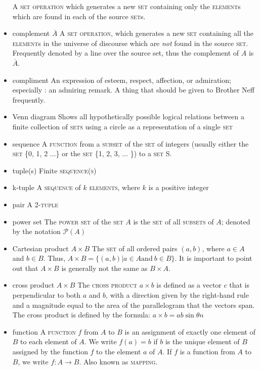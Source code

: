 \documentclass{article}
\newcommand{\term}[1]{\textsc{#1}}
\begin{document}
\begin{itemize}
  \subitem A \term{set operation} which generates a new \term{set} containing only the \term{element}s which are found in each of the source \term{set}s.
\item complement $\overline{A}$
  \subitem A \term{set operation}, which generates a new \term{set} containing all the \term{element}s in the universe of discourse which are \emph{not} found in the source \term{set}.  Frequently denoted by a line over the source set, thus the complement of $A$ is $\overline{A}$.
\item compliment
  \subitem An expression of esteem, respect, affection, or admiration; especially : an admiring remark. A thing that should be given to Brother Neff frequently. 
\item Venn diagram
  \subitem Shows all hypothetically possible logical relations between a finite collection of \term{sets} using a circle as a representation of a single \term{set}
\item sequence
  \subitem A \term{function} from a \term{subset} of the \term{set} of integers (usually either the \term{set} \{0, 1, 2 ...\} or the \term{set} \{1, 2, 3, ... \}) to a \term{set} S. 
\item tuple(s)
   \subitem Finite \term{sequence(s)}
\item k-tuple
   \subitem A \term{sequence} of $k$ \term{elements}, where $k$ is a positive integer
\item pair
   \subitem A 2-\term{tuple}
\item power set 
  \subitem The \term{power set} of the \term{set} $A$ is the \term{set} of all \term{subsets} of $A$; denoted by the notation $\mathcal{P}\left(A\right)$

\item Cartesian product $A \times B$
  \subitem The \term{set} of all ordered pairs $(a, b)$, where $a \in A$ and $b \in B$. Thus, $A \times B = \{(a,b) | a\in A \text{and} \ b\in B\}$. It is important to point out that $A \times B$ is generally not the same as $B \times A$.

\item cross product $A \times B$
  \subitem The \term{cross product} $a \times b$ is defined as a vector $c$ that is perpendicular to both $a$ and $b$, with a direction given by the right-hand rule and a magnitude equal to the area of the parallelogram that the vectors span. The cross product is defined by the formula: $a \times b = a b \sin \theta n$

\item function
  \subitem A \term{function} $f$ from $A$ to $B$ is an assignment of exactly one element of $B$ to each element of $A$. We write $f(a) = b$ if $b$ is the unique element of $B$ assigned by the function $f$ to the element $a$ of $A$. If $f$ is a function from $A$ to $B$, we write $f \colon A \to B$. Also known as \term{mapping}.


\end{itemize}
\end{document}
